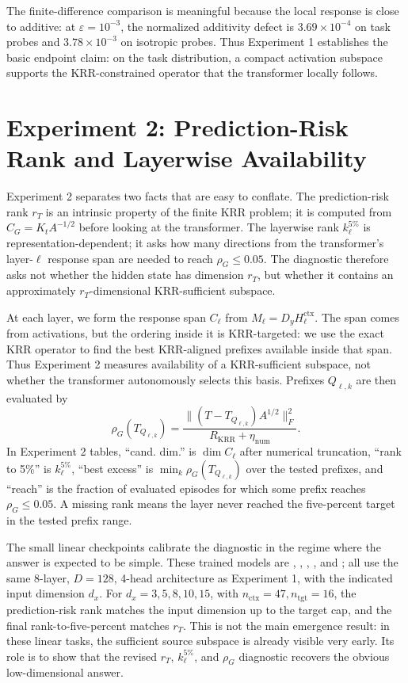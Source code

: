 \documentclass[11pt]{article}
\begin{document}
The finite-difference comparison is meaningful because the local response is close to additive:
at \(\varepsilon=10^{-3}\), the normalized additivity defect is \(3.69\times10^{-4}\) on task probes
and \(3.78\times10^{-3}\) on isotropic probes. Thus Experiment 1 establishes the basic endpoint
claim: on the task distribution, a compact activation subspace supports the KRR-constrained
operator that the transformer locally follows.

\FloatBarrier

\section{Experiment 2: Prediction-Risk Rank and Layerwise Availability}

Experiment 2 separates two facts that are easy to conflate. The prediction-risk rank \(r_T\) is an
intrinsic property of the finite KRR problem; it is computed from \(C_G=K_tA^{-1/2}\) before looking
at the transformer. The layerwise rank \(k_\ell^{5\%}\) is representation-dependent; it asks how
many directions from the transformer's layer-\(\ell\) response span are needed to reach
\(\rho_G\le0.05\). The diagnostic therefore asks not whether the hidden state has dimension
\(r_T\), but whether it contains an approximately \(r_T\)-dimensional KRR-sufficient subspace.

At each layer, we form the response span \(C_\ell\) from \(M_\ell=D_yH_\ell^{\mathrm{ctx}}\). The
span comes from activations, but the ordering inside it is KRR-targeted: we use the exact KRR
operator to find the best KRR-aligned prefixes available inside that span. Thus Experiment 2 measures
availability of a KRR-sufficient subspace, not whether the transformer autonomously selects this
basis. Prefixes \(Q_{\ell,k}\) are then evaluated by
\[
\rho_G(T_{Q_{\ell,k}})
=
\frac{\|(T-T_{Q_{\ell,k}})A^{1/2}\|_F^2}{R_{\mathrm{KRR}}+\eta_{\mathrm{num}}}.
\]
In Experiment 2 tables, ``cand. dim.'' is \(\dim C_\ell\) after numerical truncation, ``rank to
5\%'' is \(k_\ell^{5\%}\), ``best excess'' is \(\min_k\rho_G(T_{Q_{\ell,k}})\) over the tested
prefixes, and ``reach'' is the fraction of evaluated episodes for which some prefix reaches
\(\rho_G\le0.05\). A missing rank means the layer never reached the five-percent target in the
tested prefix range.

The small linear checkpoints calibrate the diagnostic in the regime where the answer is expected to
be simple. These trained models are
, , ,
, and ; all use the same 8-layer,
\(D=128\), 4-head architecture as Experiment 1, with the indicated input dimension \(d_x\). For
\(d_x=3,5,8,10,15\), with \(n_{\mathrm{ctx}}=47,n_{\mathrm{tgt}}=16\), the prediction-risk rank
matches the input dimension up to the target cap, and the final rank-to-five-percent matches
\(r_T\). This is not the main emergence result: in these linear tasks, the sufficient source
subspace is already visible very early. Its role is to show that the revised \(r_T\),
\(k_\ell^{5\%}\), and \(\rho_G\) diagnostic recovers the obvious low-dimensional answer.
\end{document}
